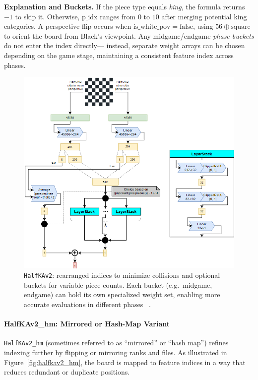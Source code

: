\documentclass[12pt,a4paper]{article}
\begin{document}
\noindent
\textbf{Explanation and Buckets.}
If the piece type equals \emph{king}, the formula returns \(-1\) to skip it. 
Otherwise, \(\mathrm{p\_idx}\) ranges from \(0\) to \(10\) after merging potential king categories. 
A perspective flip occurs when \(\mathrm{is\_white\_pov} = \text{false}\), using 
\(56 \oplus \text{square}\) to orient the board from Black’s viewpoint. 
Any midgame/endgame \emph{phase buckets} do not enter the index directly— 
instead, separate weight arrays can be chosen depending on the game stage, 
maintaining a consistent feature index across phases.


\begin{figure}[H]
    \centering
    \includegraphics[width=1\textwidth]{figures/sfnn2.png}
    \caption{\texttt{HalfKAv2}: rearranged indices to minimize collisions 
    and optional buckets for variable piece counts. Each bucket (e.g.\ midgame, endgame)
    can hold its own specialized weight set, enabling more accurate evaluations 
    in different phases ~\cite{githubdocs}.}
    \label{fig:halfkav2}
\end{figure}

\paragraph{HalfKAv2\_hm: Mirrored or Hash-Map Variant}
\label{sec:halfkav2_hm}

\texttt{HalfKAv2\_hm} (sometimes referred to as “mirrored” or “hash map”) refines indexing further by flipping or mirroring ranks and files. As illustrated in Figure~\ref{fig:halfkav2_hm}, the board is mapped to feature indices in a way that reduces redundant or duplicate positions. 
\end{document}
